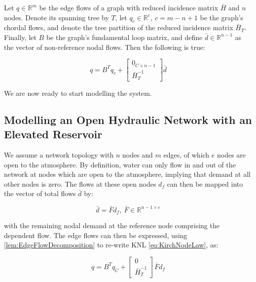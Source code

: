 \begin{lemma}\label{lem:EdgeFlowDecomposition}
	Let $q \in \mathbb{R}^m$ be the edge flows of a graph with reduced incidence matrix $\bar{H}$ and $n$ nodes. Denote its spanning tree by $T$, let $q_c \in \mathbb{R}^c, \ c = m-n+1$ be the graph's chordal flows, and denote the tree partition of the reduced incidence matrix $\bar{H}_T$. Finally, let $B$ be the graph's fundamental loop matrix, and define $\bar{d} \in \mathbb{R}^{n-1}$ as the vector of non-reference nodal flows. Then the following is true:
	
	\begin{equation}\label{eq:EdgeFlowDecomposition}
		q = B^T q_c +
		\begin{bmatrix}
			0_{C \times n-1} \\ \bar{H}_T^{-1} 
		\end{bmatrix}
		 \bar{d}
	\end{equation}
\end{lemma}

We are now ready to start modelling the system.

\subsection{Modelling an Open Hydraulic Network with an Elevated Reservoir}\label{subsec:ModelWithTank}

We assume a network topology with $n$ nodes and $m$ edges, of which $e$ nodes are open to the atmosphere. By definition, water can only flow in and out of the network at nodes which are open to the atmosphere, implying that demand at all other nodes is zero. The flows at these open nodes $d_f$ can then be mapped into the vector of total flows $\bar{d}$ by:

\begin{equation}\label{eq:IndependentFlows}
	\bar{d} = \bar{F} d_f, \ \bar{F} \in \mathbb{R}^{n-1 \times e}
\end{equation}

with the remaining nodal demand at the reference node comprising the dependent flow. The edge flows can then be expressed, using \cref{lem:EdgeFlowDecomposition} to re-write KNL \cref{eq:KirchNodeLaw}, as:

\begin{equation}\label{eq:EdgeFlows}
	q = B^T q_C +
	\begin{bmatrix} 0 \\ \bar{H}_T^{-1} \end{bmatrix} {\bar{F}}  d_f
\end{equation}

